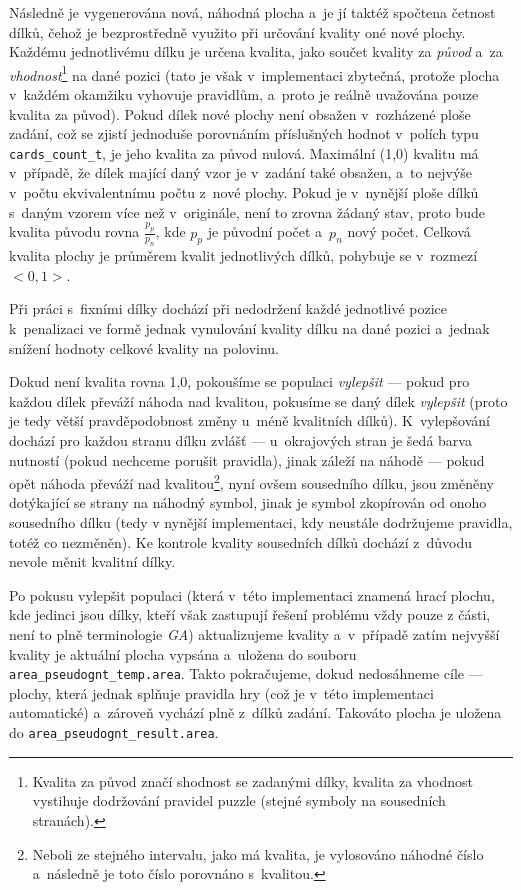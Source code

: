 \documentclass[11pt, titlepage]{report}
\begin{document}
Následně je vygenerována nová, náhodná plocha a~je jí taktéž spočtena četnost dílků, čehož je bezprostředně využito při určování kvality oné nové plochy. Každému jednotlivému dílku je určena kvalita, jako součet kvality za \emph{původ} a~za \emph{vhodnost}\footnote{Kvalita za původ značí shodnost se zadanými dílky, kvalita za vhodnost vystihuje dodržování pravidel puzzle (stejné symboly na sousedních stranách).} na dané pozici (tato je však v~implementaci zbytečná, protože plocha v~každém okamžiku vyhovuje pravidlům, a~proto je reálně uvažována pouze kvalita za původ). Pokud dílek nové plochy není obsažen v~rozházené ploše zadání, což se zjistí jednoduše porovnáním příslušných hodnot v~polích typu \texttt{cards\_count\_t}, je jeho kvalita za původ nulová. Maximální (1,0) kvalitu má v~případě, že dílek mající daný vzor je v~zadání také obsažen, a~to nejvýše v~počtu ekvivalentnímu počtu z~nové plochy. Pokud je v~nynější ploše dílků s~daným vzorem více než v~originále, není to zrovna žádaný stav, proto bude kvalita původu rovna $\frac{p_{p}}{p_{n}}$, kde $p_{p}$ je původní počet a~$p_{n}$ nový počet. Celková kvalita plochy je průměrem kvalit jednotlivých dílků, pohybuje se v~rozmezí $<0, 1>$.

\newpage Při práci s~fixními dílky dochází při nedodržení každé jednotlivé pozice k~penalizaci ve formě jednak vynulování kvality dílku na dané pozici a~jednak snížení hodnoty celkové kvality na polovinu.

Dokud není kvalita rovna 1,0, pokoušíme se populaci \emph{vylepšit} --- pokud pro každou dílek převáží náhoda nad kvalitou, pokusíme se daný dílek \emph{vylepšit} (proto je tedy větší pravděpodobnost změny u~méně kvalitních dílků). K~vylepšování dochází pro každou stranu dílku zvlášť --- u~okrajových stran je šedá barva nutností (pokud nechceme porušit pravidla), jinak záleží na náhodě --- pokud opět náhoda převáží nad kvalitou\footnote{Neboli ze stejného intervalu, jako má kvalita, je vylosováno náhodné číslo a~následně je toto číslo porovnáno s~kvalitou.}, nyní ovšem sousedního dílku, jsou změněny dotýkající se strany na náhodný symbol, jinak je symbol zkopírován od onoho sousedního dílku (tedy v nynější implementaci, kdy neustále dodržujeme pravidla, totéž co nezměněn). Ke kontrole kvality sousedních dílků dochází z~důvodu nevole měnit kvalitní dílky.

Po pokusu vylepšit populaci (která v~této implementaci znamená hrací plochu, kde jedinci jsou dílky, kteří však zastupují řešení problému vždy pouze z části, není to plně terminologie \emph{GA}) aktualizujeme kvality a~v~případě zatím nejvyšší kvality je aktuální plocha vypsána a~uložena do souboru \texttt{area\_pseudognt\_temp.area}. Takto pokračujeme, dokud nedosáhneme cíle --- plochy, která jednak splňuje pravidla hry (což je v~této implementaci automatické) a~zároveň vychází plně z~dílků zadání. Takováto plocha je uložena do \texttt{area\_pseudognt\_result.area}.
\end{document}
